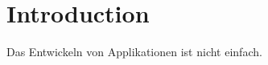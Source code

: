 \section{Introduction}
\label{sec:introduction-words}
	
Das Entwickeln von Applikationen ist nicht einfach.